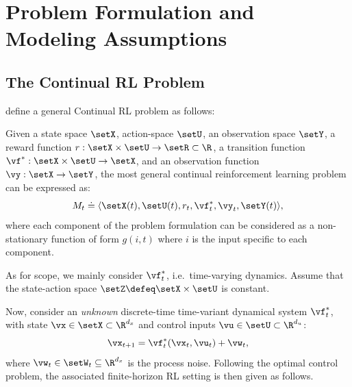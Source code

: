 \chapter{Problem Formulation and Modeling Assumptions}
\label{chapter:problem}

\section{The Continual RL Problem}

 define a general Continual RL problem as follows:

\begin{definition}
\label{def:crl}
 Given a state space $\setX$, action-space $\setU$, an observation space $\setY$, a reward function $r: \setX \times \setU \rightarrow \setR \subset \R$, a transition function $\vf^*: \setX \times \setU \rightarrow \setX$, and an observation function $\vy: \setX \rightarrow \setY$, the most general continual reinforcement learning problem can be expressed as:
\[
M_t \doteq\langle\setX(t), \setU(t), r_t, \vf^*_t, \vy_t, \setY(t)\rangle,
\]
where each component of the problem formulation can be considered as a non-stationary function of form $g(i, t)$ where $i$ is the input specific to each component.
\end{definition}

As for scope, we mainly consider $\vf^*_t$, i.e.~time-varying dynamics. Assume that the state-action space $\setZ\defeq\setX\times\setU$ is constant.

Now, consider an \emph{unknown} discrete-time time-variant dynamical system $\vf^*_t$, with state $\vx \in \setX \subset \R^{d_x}$ and control inputs $\vu \in \setU \subset \R^{d_u}$:
\begin{equation}
    \vx_{t+1} = \vf^*_t(\vx_t, \vu_t) + \vw_t,
    \label{eq:system_eq}
\end{equation}
where $\vw_t \in \setW_t \subseteq \R^{d_x}$ is the process noise. Following the optimal control \citep[OC, c.f.][]{luenberger_oc_1971} problem, the associated finite-horizon RL setting \citep{puterman_markov_1994} is then given as follows.

